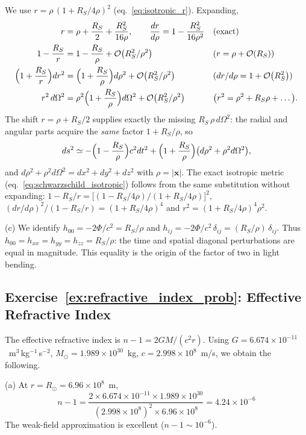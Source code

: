 \begin{derivation}
We use $r = \rho\,(1 + R_S/4\rho)^2$ (eq.~\eqref{eq:isotropic_r}).  Expanding,
\begin{align*}
r &= \rho + \frac{R_S}{2} + \frac{R_S^2}{16\rho},
\qquad
\frac{dr}{d\rho} = 1 - \frac{R_S^2}{16\rho^2}
  && \text{(exact)} \\
1 - \frac{R_S}{r} &= 1 - \frac{R_S}{\rho} + \mathcal{O}\!\left(R_S^2/\rho^2\right)
  && (r = \rho + \mathcal{O}\!\left(R_S\right)) \\
\Bigl(1 + \frac{R_S}{r}\Bigr)dr^2 &= \Bigl(1 + \frac{R_S}{\rho}\Bigr)d\rho^2
  + \mathcal{O}\!\left(R_S^2/\rho^2\right)
  && (dr/d\rho = 1 + \mathcal{O}\!\left(R_S^2\right)) \\
r^2\,d\Omega^2 &= \rho^2\Bigl(1 + \frac{R_S}{\rho}\Bigr)d\Omega^2
  + \mathcal{O}\!\left(R_S^2/\rho^2\right)
  && \bigl(r^2 = \rho^2 + R_S\rho + \dots\bigr) .
\end{align*}
The shift $r = \rho + R_S/2$ supplies exactly the missing $R_S\,\rho\,d\Omega^2$:
the radial and angular parts acquire the \emph{same} factor
$1 + R_S/\rho$, so
\[
ds^2 \simeq -\Bigl(1 - \frac{R_S}{\rho}\Bigr)c^2dt^2
+ \Bigl(1 + \frac{R_S}{\rho}\Bigr)\bigl(d\rho^2 + \rho^2d\Omega^2\bigr) ,
\]
and $d\rho^2 + \rho^2d\Omega^2 = dx^2 + dy^2 + dz^2$ with $\rho = |\mathbf{x}|$.
The exact isotropic metric (eq.~\eqref{eq:schwarzschild_isotropic}) follows
from the same substitution without expanding:
$1 - R_S/r = \bigl[(1 - R_S/4\rho)/(1 + R_S/4\rho)\bigr]^2$,
$(dr/d\rho)^2/(1 - R_S/r) = (1 + R_S/4\rho)^4$ and
$r^2 = (1 + R_S/4\rho)^4\rho^2$.
\end{derivation}


(c) We identify $h_{00} = -2\Phi/c^2 = R_S/\rho$ and
$h_{ij} = -2\Phi/c^2\, \delta_{ij} = (R_S/\rho)\, \delta_{ij}$.
Thus $h_{00} = h_{xx} = h_{yy} = h_{zz} = R_S/\rho$: the time and
spatial diagonal perturbations are equal in magnitude.  This equality is
the origin of the factor of two in light bending.

\subsection*{Exercise~\ref{ex:refractive_index_prob}: Effective Refractive Index}

The effective refractive index is $n - 1 = 2GM/(c^2 r)$.
Using $G = 6.674 \times 10^{-11}$~m$^3$\,kg$^{-1}$\,s$^{-2}$,
$M_\odot = 1.989 \times 10^{30}$~kg, $c = 2.998 \times 10^8$~m/s, we obtain the following.

(a) At $r = R_\odot = 6.96 \times 10^8$~m,
\[
    n - 1 = \frac{2 \times 6.674\!\times\!10^{-11} \times 1.989\!\times\!10^{30}}
    {(2.998\!\times\!10^{8})^2 \times 6.96\!\times\!10^{8}}
    = \boxed{4.24 \times 10^{-6}}
\]
The weak-field approximation is excellent ($n - 1 \sim 10^{-6}$).

